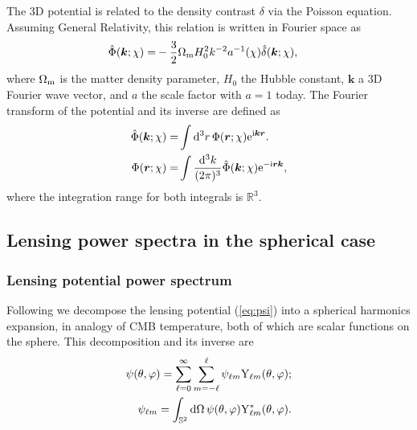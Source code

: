 \documentclass[useAMS,usenatbib]{mn2e} %
\renewcommand{\vec}{\bm}
\begin{document}
The 3D potential is related to the density contrast $\delta$ via the Poisson
equation. Assuming General Relativity, this relation is written in Fourier space as
%
\begin{align}
  \hat \Phi(\vec k; \chi) = & - \frac 3 2 \Omega_{\rm m} H_0^2 k^{-2} a^{-1}(\chi) \hat \delta(\vec k; \chi),
      \label{eq:poisson}
\end{align}
%
where $\Omega_{\rm m}$ is the matter density parameter, $H_0$ the Hubble constant, $\vec k$ a 3D Fourier wave
vector, and $a$ the scale factor with $a=1$ today.
The Fourier transform of the potential and its inverse are defined as
%
\begin{align}
  \hat \Phi(\vec k; \chi) = &  \int {\rm d}^3 r \, \Phi(\vec r; \chi) {\rm e}^{{\rm i} \vec k \vec r} .
  \label{eq:hatPhi}
  \\
  \Phi(\vec r; \chi) = &  \int \frac{{\rm d}^3 k}{(2\pi)^3}
      \hat \Phi(\vec k; \chi) {\rm e}^{-{\rm i} \vec r \vec k},
  \label{eq:hatPhi_inv}
\end{align}
%
where the integration range for both integrals is $\mathbb{R}^3$.


\subsection{Lensing power spectra in the spherical case}

\subsubsection{Lensing potential power spectrum}

Following \cite{2000PhRvD..62d3007H} we decompose the lensing potential
(\ref{eq:psi}) into a spherical harmonics expansion, in analogy of CMB
temperature, both of which are scalar functions on the sphere. This
decomposition and its inverse are
%
%
\begin{align}
  \psi(\theta, \varphi) = \sum_{\ell=0}^\infty \sum_{m=-\ell}^\ell \psi_{\ell m} {\rm Y}_{\ell m}(\theta, \varphi);
    \label{eq:psi_harm_exp}
    \\
  \psi_{\ell m} = \int_{\mathbb{S}^2} {\rm d} \Omega \, \psi(\theta, \varphi) {\rm Y}^\ast_{\ell m}(\theta, \varphi).
  \label{eq:psi_harm_exp_inv}
\end{align}
\end{document}
